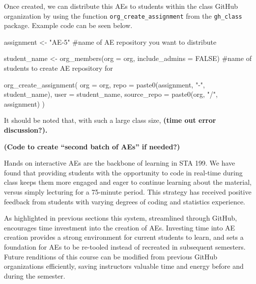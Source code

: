 \documentclass[
  12pt]{article}
\newenvironment{Shaded}{\begin{snugshade}}{\end{snugshade}}
\newcommand{\AttributeTok}[1]{\textcolor[rgb]{0.40,0.45,0.13}{#1}}
\newcommand{\CommentTok}[1]{\textcolor[rgb]{0.37,0.37,0.37}{#1}}
\newcommand{\ConstantTok}[1]{\textcolor[rgb]{0.56,0.35,0.01}{#1}}
\newcommand{\FunctionTok}[1]{\textcolor[rgb]{0.28,0.35,0.67}{#1}}
\newcommand{\NormalTok}[1]{\textcolor[rgb]{0.00,0.23,0.31}{#1}}
\newcommand{\OtherTok}[1]{\textcolor[rgb]{0.00,0.23,0.31}{#1}}
\newcommand{\StringTok}[1]{\textcolor[rgb]{0.13,0.47,0.30}{#1}}
\begin{document}
Once created, we can distribute this AEs to students within the class
GitHub organization by using the function
\texttt{org\_create\_assignment} from the \texttt{gh\_class} package.
Example code can be seen below.

\begin{Shaded}
\begin{Highlighting}[]
\NormalTok{assignment }\OtherTok{\textless{}{-}} \StringTok{"AE{-}5"} \CommentTok{\#name of AE repository you want to distribute }

\NormalTok{student\_name }\OtherTok{\textless{}{-}} \FunctionTok{org\_members}\NormalTok{(}\AttributeTok{org =}\NormalTok{ org, }\AttributeTok{include\_admins =} \ConstantTok{FALSE}\NormalTok{) }\CommentTok{\#name of students to create AE repository for}

\FunctionTok{org\_create\_assignment}\NormalTok{(}
  \AttributeTok{org =}\NormalTok{ org,}
  \AttributeTok{repo =} \FunctionTok{paste0}\NormalTok{(assignment, }\StringTok{"{-}"}\NormalTok{, student\_name),}
  \AttributeTok{user =}\NormalTok{ student\_name,}
  \AttributeTok{source\_repo =} \FunctionTok{paste0}\NormalTok{(org, }\StringTok{"/"}\NormalTok{, assignment)}
\NormalTok{)}
\end{Highlighting}
\end{Shaded}

It should be noted that, with such a large class size, \textbf{(time out
error discussion?).}

\textbf{(Code to create ``second batch of AEs'' if needed?)}

Hands on interactive AEs are the backbone of learning in STA 199. We
have found that providing students with the opportunity to code in
real-time during class keeps them more engaged and eager to continue
learning about the material, versus simply lecturing for a 75-minute
period. This strategy has received positive feedback from students with
varying degrees of coding and statistics experience.

As highlighted in previous sections this system, streamlined through
GitHub, encourages time investment into the creation of AEs. Investing
time into AE creation provides a strong environment for current students
to learn, and sets a foundation for AEs to be re-tooled instead of
recreated in subsequent semesters. Future renditions of this course can
be modified from previous GitHub organizations efficiently, saving
instructors valuable time and energy before and during the semester.
\end{document}
